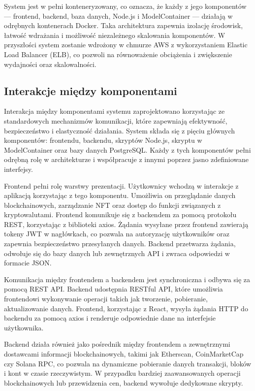 System jest w pełni konteneryzowany, co oznacza, że każdy z jego komponentów — frontend, backend, baza danych, Node.js i ModelContainer — działają w odrębnych kontenerach Docker. Taka architektura zapewnia izolację środowisk, łatwość wdrażania i możliwość niezależnego skalowania komponentów. W przyszłości system zostanie wdrożony w chmurze AWS z wykorzystaniem Elastic Load Balancer (ELB), co pozwoli na równoważenie obciążenia i zwiększenie wydajności oraz skalowalności.

\subsection{Interakcje między komponentami}
Interakcja między komponentami systemu zaprojektowano korzystając ze standardowych mechanizmów komunikacji, które zapewniają efektywność, bezpieczeństwo i elastyczność działania. System składa się z pięciu głównych komponentów: frontendu, backendu, skryptów Node.js, skryptu w ModelContainer oraz bazy danych PostgreSQL. Każdy z tych komponentów pełni odrębną rolę w architekturze i współpracuje z innymi poprzez jasno zdefiniowane interfejsy.

Frontend pełni rolę warstwy prezentacji. Użytkownicy wchodzą w interakcje z aplikacją korzystając z tego komponentu. Umożliwia on przeglądanie danych blockchainowych, zarządzanie NFT oraz dostęp do funkcji związanych z kryptowalutami. Frontend komunikuje się z backendem za pomocą protokołu REST, korzystając z biblioteki axios. Żądania wysyłane przez frontend zawierają tokeny JWT w nagłówkach, co pozwala na autoryzację użytkowników oraz zapewnia bezpieczeństwo przesyłanych danych. Backend przetwarza żądania, odwołuje się do bazy danych lub zewnętrznych API i zwraca odpowiedzi w formacie JSON.

Komunikacja między frontendem a backendem jest synchroniczna i odbywa się za pomocą REST API. Backend udostępnia RESTful API, które umożliwia frontendowi wykonywanie operacji takich jak tworzenie, pobieranie, aktualizowanie danych. Frontend, korzystając z React, wysyła żądania HTTP do backendu za pomocą axios i renderuje odpowiednie dane na interfejsie użytkownika.

Backend działa również jako pośrednik między frontendem a zewnętrznymi dostawcami informacji blockchainowych, takimi jak Etherscan, CoinMarketCap czy Solana RPC, co pozwala na dynamiczne pobieranie danych transakcji, bloków i kont w czasie rzeczywistym. W przypadku bardziej zaawansowanych operacji blockchainowych lub przewidzenia cen, backend wywołuje dedykowane skrypty.

